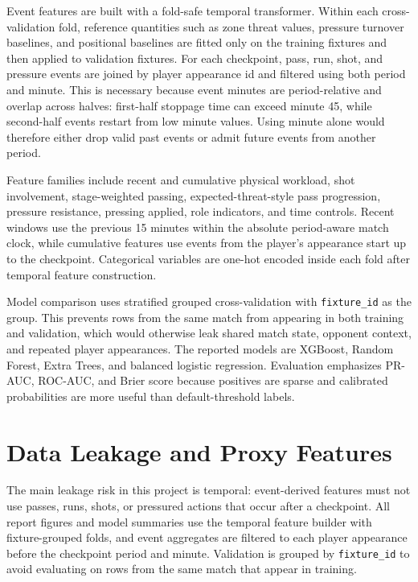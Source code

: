 \documentclass[11pt]{article}
\begin{document}
Event features are built with a fold-safe temporal transformer.
Within each cross-validation fold, reference quantities such as zone threat values, pressure turnover baselines, and positional baselines are fitted only on the training fixtures and then applied to validation fixtures.
For each checkpoint, pass, run, shot, and pressure events are joined by player appearance id and filtered using both period and minute.
This is necessary because event minutes are period-relative and overlap across halves: first-half stoppage time can exceed minute 45, while second-half events restart from low minute values.
Using minute alone would therefore either drop valid past events or admit future events from another period.

Feature families include recent and cumulative physical workload, shot involvement, stage-weighted passing, expected-threat-style pass progression, pressure resistance, pressing applied, role indicators, and time controls.
Recent windows use the previous 15 minutes within the absolute period-aware match clock, while cumulative features use events from the player's appearance start up to the checkpoint.
Categorical variables are one-hot encoded inside each fold after temporal feature construction.

Model comparison uses stratified grouped cross-validation with \texttt{fixture\_id} as the group.
This prevents rows from the same match from appearing in both training and validation, which would otherwise leak shared match state, opponent context, and repeated player appearances.
The reported models are XGBoost, Random Forest, Extra Trees, and balanced logistic regression.
Evaluation emphasizes PR-AUC, ROC-AUC, and Brier score because positives are sparse and calibrated probabilities are more useful than default-threshold labels.

\section{Data Leakage and Proxy Features}
The main leakage risk in this project is temporal: event-derived features must not use passes, runs, shots, or pressured actions that occur after a checkpoint.
All report figures and model summaries use the temporal feature builder with fixture-grouped folds, and event aggregates are filtered to each player appearance before the checkpoint period and minute.
Validation is grouped by \texttt{fixture\_id} to avoid evaluating on rows from the same match that appear in training.
\end{document}

